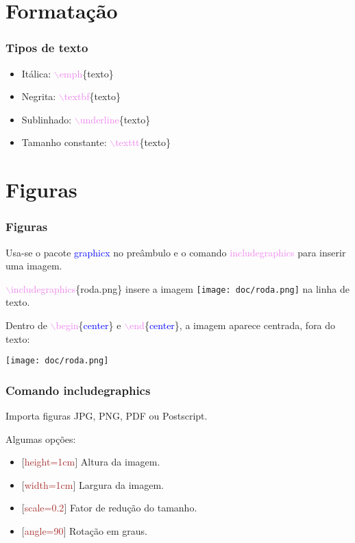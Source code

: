 \documentclass{beamer}
\begin{document}
\section{Formatação}
\begin{frame}
  \frametitle{Tipos de texto}
  \begin{itemize}
  \item<1-> Itálica: \textcolor{violet}{$\backslash$emph}\{texto\}
  \item<2-> Negrita: \textcolor{violet}{$\backslash$textbf}\{texto\}
  \item<3-> Sublinhado: \textcolor{violet}{$\backslash$underline}\{texto\}
  \item<4-> Tamanho constante: \textcolor{violet}{$\backslash$texttt}\{texto\}
  \end{itemize}
\end{frame}
\section{Figuras}
\begin{frame}
  \frametitle{Figuras}
  Usa-se o pacote \textcolor{blue}{graphicx} no preâmbulo e o comando
  \textcolor{violet}{includegraphics} para inserir uma imagem.\pause

  \textcolor{violet}{$\backslash$includegraphics}\{roda.png\} insere a imagem
  \texttt{[image: doc/roda.png]} na linha de texto.\pause

  Dentro de
  \textcolor{violet}{$\backslash$begin}\{\textcolor{blue}{center}\}
  e \textcolor{violet}{$\backslash$end}\{\textcolor{blue}{center}\}, a
  imagem aparece centrada, fora do texto:\pause
  \begin{center}
    \texttt{[image: doc/roda.png]}
  \end{center}
\end{frame}
\begin{frame}
  \frametitle{Comando includegraphics}
  Importa figuras JPG, PNG, PDF ou Postscript.\pause

  Algumas opções:
  \begin{itemize}
  \item<2-> $[$\textcolor{brown}{height=1cm}$]$ Altura da imagem.
  \item<3-> $[$\textcolor{brown}{width=1cm}$]$ Largura da imagem.
  \item<4-> $[$\textcolor{brown}{scale=0.2}$]$ Fator de redução do tamanho.
  \item<5-> $[$\textcolor{brown}{angle=90}$]$ Rotação em graus.
  \end{itemize}
\end{frame}
\end{document}
